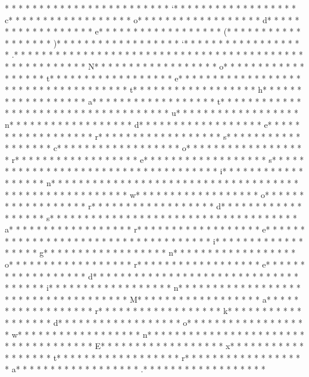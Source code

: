 *  *  * * *  *  * * *  * * *  * * *  *  * * *  *  * * *  * `* * *  * * *  * * *  *  * * *  *  * * *  * c* * *  * * *  * * *  *  * * *  *  * * *  * o* * *  * * *  * * *  *  * * *  *  * * *  * d* * *  * * *  * * *  *  * * *  *  * * *  * e* * *  * * *  * * *  *  * * *  *  * * *  * (* * *  * * *  * * *  *  * * *  *  * * *  * )* * *  * * *  * * *  *  * * *  *  * * *  * `* * *  * * *  * * *  *  * * *  *  * * *  * .* * *  * * *  * * *  *  * * *  *  * * *  *  * * *  * * *  * * *  *  * * *  *  * * *  * 
* * *  * * *  * * *  *  * * *  *  * * *  * N* * *  * * *  * * *  *  * * *  *  * * *  * o* * *  * * *  * * *  *  * * *  *  * * *  * t* * *  * * *  * * *  *  * * *  *  * * *  * e* * *  * * *  * * *  *  * * *  *  * * *  *  * * *  * * *  * * *  *  * * *  *  * * *  * t* * *  * * *  * * *  *  * * *  *  * * *  * h* * *  * * *  * * *  *  * * *  *  * * *  * a* * *  * * *  * * *  *  * * *  *  * * *  * t* * *  * * *  * * *  *  * * *  *  * * *  *  * * *  * * *  * * *  *  * * *  *  * * *  * u* * *  * * *  * * *  *  * * *  *  * * *  * n* * *  * * *  * * *  *  * * *  *  * * *  * d* * *  * * *  * * *  *  * * *  *  * * *  * e* * *  * * *  * * *  *  * * *  *  * * *  * r* * *  * * *  * * *  *  * * *  *  * * *  * s* * *  * * *  * * *  *  * * *  *  * * *  * c* * *  * * *  * * *  *  * * *  *  * * *  * o* * *  * * *  * * *  *  * * *  *  * * *  * r* * *  * * *  * * *  *  * * *  *  * * *  * e* * *  * * *  * * *  *  * * *  *  * * *  * s* * *  * * *  * * *  *  * * *  *  * * *  *  * * *  * * *  * * *  *  * * *  *  * * *  * i* * *  * * *  * * *  *  * * *  *  * * *  * n* * *  * * *  * * *  *  * * *  *  * * *  *  * * *  * * *  * * *  *  * * *  *  * * *  * 
* * *  * * *  * * *  *  * * *  *  * * *  * w* * *  * * *  * * *  *  * * *  *  * * *  * o* * *  * * *  * * *  *  * * *  *  * * *  * r* * *  * * *  * * *  *  * * *  *  * * *  * d* * *  * * *  * * *  *  * * *  *  * * *  * s* * *  * * *  * * *  *  * * *  *  * * *  *  * * *  * * *  * * *  *  * * *  *  * * *  * a* * *  * * *  * * *  *  * * *  *  * * *  * r* * *  * * *  * * *  *  * * *  *  * * *  * e* * *  * * *  * * *  *  * * *  *  * * *  *  * * *  * * *  * * *  *  * * *  *  * * *  * i* * *  * * *  * * *  *  * * *  *  * * *  * g* * *  * * *  * * *  *  * * *  *  * * *  * n* * *  * * *  * * *  *  * * *  *  * * *  * o* * *  * * *  * * *  *  * * *  *  * * *  * r* * *  * * *  * * *  *  * * *  *  * * *  * e* * *  * * *  * * *  *  * * *  *  * * *  * d* * *  * * *  * * *  *  * * *  *  * * *  *  * * *  * * *  * * *  *  * * *  *  * * *  * i* * *  * * *  * * *  *  * * *  *  * * *  * n* * *  * * *  * * *  *  * * *  *  * * *  *  * * *  * * *  * * *  *  * * *  *  * * *  * M* * *  * * *  * * *  *  * * *  *  * * *  * a* * *  * * *  * * *  *  * * *  *  * * *  * r* * *  * * *  * * *  *  * * *  *  * * *  * k* * *  * * *  * * *  *  * * *  *  * * *  * d* * *  * * *  * * *  *  * * *  *  * * *  * o* * *  * * *  * * *  *  * * *  *  * * *  * w* * *  * * *  * * *  *  * * *  *  * * *  * n* * *  * * *  * * *  *  * * *  *  * * *  *  * * *  * * *  * * *  *  * * *  *  * * *  * E* * *  * * *  * * *  *  * * *  *  * * *  * x* * *  * * *  * * *  *  * * *  *  * * *  * t* * *  * * *  * * *  *  * * *  *  * * *  * r* * *  * * *  * * *  *  * * *  *  * * *  * a* * *  * * *  * * *  *  * * *  *  * * *  * .* * *  * * *  * * *  *  * * *  *  * * *  * 
